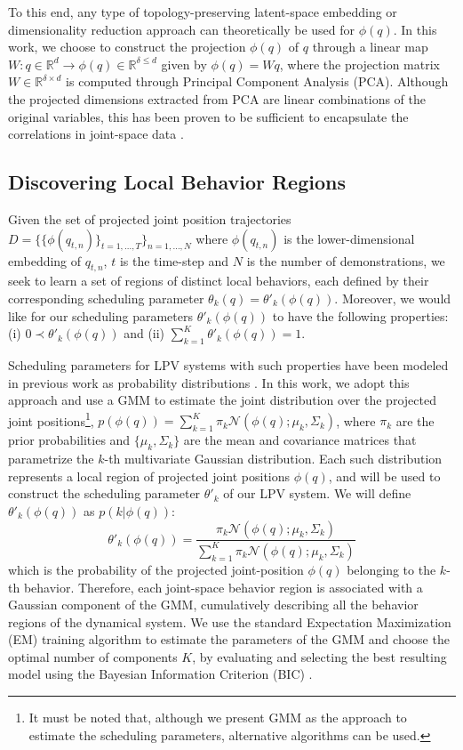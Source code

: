 \documentclass[letterpaper, 10 pt, conference,fleqn]{ieeeconf}
\begin{document}
To this end, any type of topology-preserving latent-space embedding or dimensionality reduction approach can theoretically be used for $\phi(q)$. In this work, we choose to construct the projection $\phi(q)$ of $q$ through a linear map $W:q \in \mathbb{R}^{d} \rightarrow \phi(q) \in \mathbb{R}^{\delta\leq d}$ given by $\phi(q) = Wq$, where the projection matrix $W \in \mathbb{R}^{\delta \times d}$ is computed through Principal Component Analysis (PCA). Although the projected dimensions extracted from PCA are linear combinations of the original variables, this has been proven to be sufficient to encapsulate the correlations in joint-space data \cite{calinon2005recognition}.


\subsection{Discovering Local Behavior Regions}
Given the set of projected joint position trajectories $D=\{\{\phi(q_{t,n})\}_{t=1,\dots, T}\}_{n=1,\dots,N}$ where $\phi(q_{t,n})$ is the lower-dimensional embedding of $q_{t,n}$, $t$ is the time-step and $N$ is the number of demonstrations, we seek to learn a set of regions of distinct local behaviors, each defined by their corresponding scheduling parameter $\theta_k(q) = \theta'_k(\phi(q))$. Moreover, we would like for our scheduling parameters $\theta'_k(\phi(q))$ to have the following properties: (i) $0 \prec \theta'_k(\phi(q))$ and (ii) $\sum_{k=1}^{K}\theta'_k(\phi(q)) = 1$.

Scheduling parameters for LPV systems with such properties have been modeled in previous work as probability distributions \cite{7439839, Salehian-RSS-16}. In this work, we adopt this approach and use a GMM to estimate the joint distribution over the projected joint positions\footnote{It must be noted that, although we present GMM as the approach to estimate the scheduling parameters, alternative algorithms can be used.}, $p(\phi(q)) = \sum_{k=1}^K\pi_k\mathcal{N}(\phi(q);\mu_k,\Sigma_k)$, where $\pi_k$ are the prior probabilities and $\{\mu_k,\Sigma_k\}$ are the mean and covariance matrices that parametrize the $k$-th multivariate Gaussian distribution. Each such distribution represents a local region of projected joint positions $\phi(q)$, and will be used to construct the scheduling parameter $\theta'_k$ of our LPV system. We will define $\theta'_k(\phi(q))$ as $p(k|\phi(q))$:
\begin{equation}
\label{eq:theta}
\theta'_k(\phi(q))= \frac{\pi_k\mathcal{N} (\phi(q); \mu_k, \Sigma_k)}{\sum_{k=1}^K \pi_k\mathcal{N} (\phi(q); \mu_k, \Sigma_k)}
\end{equation}
which is the probability of the projected joint-position $\phi(q)$ belonging to the $k$-th behavior. Therefore, each joint-space behavior region is associated with a Gaussian component of the GMM, cumulatively describing all the behavior regions of the dynamical system. We use the standard Expectation Maximization (EM) training algorithm to estimate the parameters of the GMM and choose the optimal number of components $K$, by evaluating and selecting the best resulting model using the Bayesian Information Criterion (BIC) \cite{Bishop:PRM:2006}.
\end{document}
